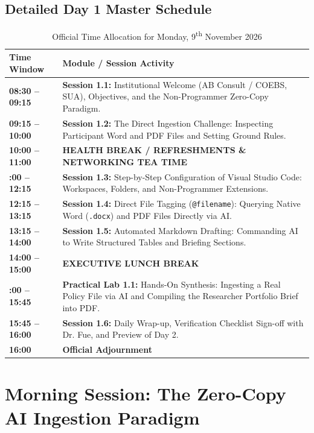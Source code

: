 \documentclass[11pt, a4paper]{report}
\begin{document}
\section{Detailed Day 1 Master Schedule}
\begin{table}[htbp]
\centering
\caption{Official Time Allocation for Monday, 9\textsuperscript{th} November 2026}
\vspace{0.2cm}
\begin{tabular}{@{}>{\bfseries}lp{11.5cm}@{}}
\toprule
Time Window & Module / Session Activity \\
\midrule
08:30 -- 09:15 & \textbf{Session 1.1:} Institutional Welcome (AB Consult / COEBS, SUA), Objectives, and the Non-Programmer Zero-Copy Paradigm. \\
09:15 -- 10:00 & \textbf{Session 1.2:} The Direct Ingestion Challenge: Inspecting Participant Word and PDF Files and Setting Ground Rules. \\
\addlinespace
\textbf{10:00 -- 11:00} & \textbf{HEALTH BREAK / REFRESHMENTS \& NETWORKING TEA TIME} \\
\addlinespace
11:00 -- 12:15 & \textbf{Session 1.3:} Step-by-Step Configuration of Visual Studio Code: Workspaces, Folders, and Non-Programmer Extensions. \\
12:15 -- 13:15 & \textbf{Session 1.4:} Direct File Tagging (\texttt{@filename}): Querying Native Word (\texttt{.docx}) and PDF Files Directly via AI. \\
13:15 -- 14:00 & \textbf{Session 1.5:} Automated Markdown Drafting: Commanding AI to Write Structured Tables and Briefing Sections. \\
\addlinespace
\textbf{14:00 -- 15:00} & \textbf{EXECUTIVE LUNCH BREAK} \\
\addlinespace
15:00 -- 15:45 & \textbf{Practical Lab 1.1:} Hands-On Synthesis: Ingesting a Real Policy File via AI and Compiling the Researcher Portfolio Brief into PDF. \\
15:45 -- 16:00 & \textbf{Session 1.6:} Daily Wrap-up, Verification Checklist Sign-off with Dr. Fue, and Preview of Day 2. \\
\textbf{16:00} & \textbf{Official Adjournment} \\
\bottomrule
\end{tabular}
\end{table}

\newpage

\chapter{Morning Session: The Zero-Copy AI Ingestion Paradigm}
\end{document}
